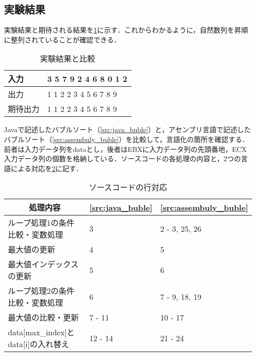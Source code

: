 \subsection{実験結果}
実験結果と期待される結果を\ref{tbl:execute}に示す．これからわかるように，自然数列を昇順に整列されていることが確認できる．\par
\begin{table}[h]
    \centering
    \caption{実験結果と比較}
    \label{tbl:execute}
    \begin{tabular}{l|l}
        入力   & {\ttfamily 1 3 5 7 9 2 4 6 8 0 1 2} \\
        \hline
        出力   & {\ttfamily 0 1 1 2 2 3 4 5 6 7 8 9} \\
        期待出力 & {\ttfamily 0 1 1 2 2 3 4 5 6 7 8 9}
    \end{tabular}
\end{table}
{\ttfamily Java}で記述したバブルソート（\ref{src:java_buble}）と，アセンブリ言語で記述したバブルソート（\ref{src:assembuly_buble}）を比較して，言語化の箇所を確認する．前者は入力データ列を{\ttfamily data}とし，後者は{\ttfamily EBX}に入力データ列の先頭番地，{\ttfamily ECX}入力データ列の個数を格納している．ソースコードの各処理の内容と，2つの言語による対応を\ref{tbl:ソースコードの行対応}に記す．
\begin{table}
    \centering
    \caption{ソースコードの行対応}
    \label{tbl:ソースコードの行対応}
    \begin{tabular}{p{10cm}p{2cm}p{2cm}}
        \multicolumn{1}{c}{処理内容}                              & \multicolumn{1}{c}{\ref{src:java_buble}} & \multicolumn{1}{c}{\ref{src:assembuly_buble}} \\
        \hline
        ループ処理1の条件比較・変数処理                                      & 3                                        & 2 - 3, 25, 26                                 \\
        最大値の更新                                                & 4                                        & 5                                             \\
        最大値インデックスの更新                                          & 5                                        & 6                                             \\
        ループ処理2の条件比較・変数処理                                      & 6                                        & 7 - 9, 18, 19                                 \\
        最大値の比較・更新                                             & 7 - 11                                   & 10 - 17                                       \\
        {\ttfamily data[max\_index]}と{\ttfamily data[i]}の入れ替え & 12 - 14                                  & 21 - 24                                       \\
        \hline
    \end{tabular}
\end{table}\\
